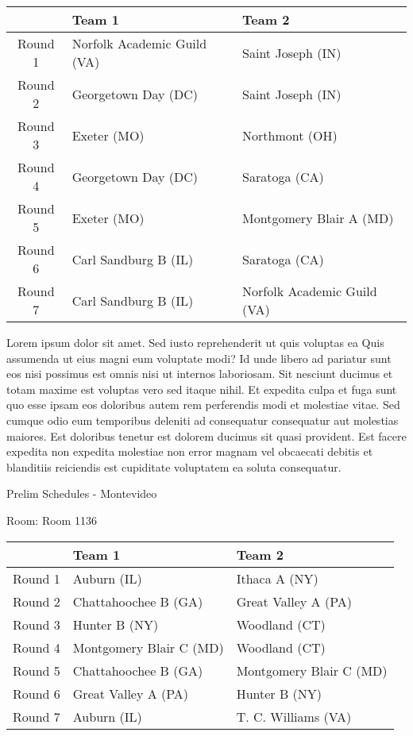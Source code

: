 \documentclass{article}%
\begin{document}
\begin{tabularx}{\textwidth}{|c|Y|Y|}%
\hline%
&Team 1&Team 2\\%
\hline%
Round 1&Norfolk Academic Guild (VA)&Saint Joseph (IN)\\%
Round 2&Georgetown Day (DC)&Saint Joseph (IN)\\%
Round 3&Exeter (MO)&Northmont (OH)\\%
Round 4&Georgetown Day (DC)&Saratoga (CA)\\%
Round 5&Exeter (MO)&Montgomery Blair A (MD)\\%
Round 6&Carl Sandburg B (IL)&Saratoga (CA)\\%
Round 7&Carl Sandburg B (IL)&Norfolk Academic Guild (VA)\\%
\hline%
\end{tabularx}%
\vspace*{8pt}%
\linebreak%
\newline%
Lorem ipsum dolor sit amet. Sed iusto reprehenderit ut quis voluptas ea Quis assumenda ut eius magni eum voluptate modi? Id unde libero ad pariatur sunt eos nisi possimus est omnis nisi ut internos laboriosam. Sit nesciunt ducimus et totam maxime est voluptas vero sed itaque nihil. Et expedita culpa et fuga sunt quo esse ipsam eos doloribus autem rem perferendis modi et molestiae vitae.\newline%
\newline%
Sed cumque odio eum temporibus deleniti ad consequatur consequatur aut molestias maiores. Est doloribus tenetur est dolorem ducimus sit quasi provident. Est facere expedita non expedita molestiae non error magnam vel obcaecati debitis et blanditiis reiciendis est cupiditate voluptatem ea soluta consequatur.%
\newpage%
\begin{center}%
\begin{Huge}%
Prelim Schedules {-} Montevideo%
\end{Huge}%
\end{center}%
\begin{flushleft}%
\begin{Large}%
Room: Room 1136%
\end{Large}%
\end{flushleft}%
\begin{tabularx}{\textwidth}{|c|Y|Y|}%
\hline%
&Team 1&Team 2\\%
\hline%
Round 1&Auburn (IL)&Ithaca A (NY)\\%
Round 2&Chattahoochee B (GA)&Great Valley A (PA)\\%
Round 3&Hunter B (NY)&Woodland (CT)\\%
Round 4&Montgomery Blair C (MD)&Woodland (CT)\\%
Round 5&Chattahoochee B (GA)&Montgomery Blair C (MD)\\%
Round 6&Great Valley A (PA)&Hunter B (NY)\\%
Round 7&Auburn (IL)&T. C. Williams (VA)\\%
\hline%
\end{tabularx}%
\end{document}
